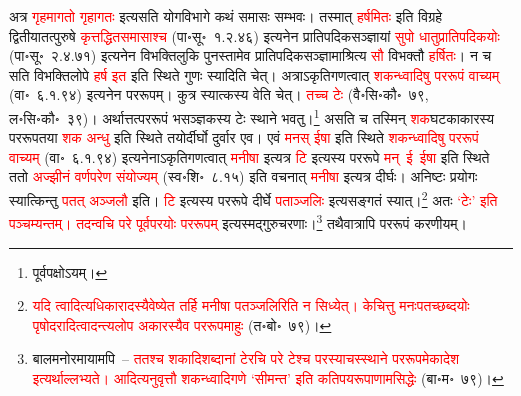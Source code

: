 \begin{sloppypar}\justifying\noindent अत्र \textcolor{red}{गृहमागतो गृहागतः} इत्यसति योग\-विभागे कथं समासः सम्भवः। तस्मात् \textcolor{red}{हर्षमितः} इति विग्रहे द्वितीया\-तत्पुरुषे \textcolor{red}{कृत्तद्धित\-समासाश्च} (पा॰सू॰~१.२.४६) इत्यनेन प्रातिपदिक\-सञ्ज्ञायां \textcolor{red}{सुपो धातु\-प्रातिपदिकयोः} (पा॰सू॰~२.४.७१) इत्यनेन विभक्ति\-लुकि पुनस्तामेव प्रातिपदिक\-सञ्ज्ञामाश्रित्य \textcolor{red}{सौ} विभक्तौ \textcolor{red}{हर्षितः}। न च सति विभक्ति\-लोपे \textcolor{red}{हर्ष इत} इति स्थिते गुणः स्यादिति चेत्। अत्राऽकृति\-गणत्वात् \textcolor{red}{शकन्ध्वादिषु पर\-रूपं वाच्यम्} (वा॰~६.१.९४) इत्यनेन पर\-रूपम्। कुत्र स्यात्कस्य वेति चेत्। \textcolor{red}{तच्च टेः} (वै॰सि॰कौ॰~७९, ल॰सि॰कौ॰~३९)। अर्थात्तत्पर\-रूपं भसञ्ज्ञकस्य टेः स्थाने भवतु।\footnote{पूर्वपक्षोऽयम्।} असति च तस्मिन् \textcolor{red}{शक}\-घटकाकारस्य पर\-रूपतया \textcolor{red}{शक अन्धु} इति स्थिते तयोर्दीर्घो दुर्वार एव। एवं \textcolor{red}{मनस् ईषा} इति स्थिते \textcolor{red}{शकन्ध्वादिषु पररूपं वाच्यम्} (वा॰~६.१.९४) इत्यनेनाऽकृति\-गणत्वात् \textcolor{red}{मनीषा} इत्यत्र \textcolor{red}{टि} इत्यस्य पररूपे \textcolor{red}{मन्~ई~ईषा} इति स्थिते ततो \textcolor{red}{अज्झीनं वर्णपरेण संयोज्यम्} (स्व॰शि॰~८.१५) इति वचनात् \textcolor{red}{मनीषा} इत्यत्र दीर्घः। अनिष्टः प्रयोगः स्यात्किन्तु \textcolor{red}{पतत् अञ्जलौ} इति। \textcolor{red}{टि} इत्यस्य पररूपे दीर्घे \textcolor{red}{पताञ्जलिः} इत्यसङ्गतं स्यात्।\footnote{\textcolor{red}{यदि त्वादित्यधि\-कारादस्यैवेष्येत तर्हि मनीषा पतञ्जलिरिति न सिध्येत्। केचित्तु मनः\-पतच्छब्दयोः पृषोदरादित्वादन्त्य\-लोप अकारस्यैव पररूपमाहुः} (त॰बो॰~७९)।} अतः \textcolor{red}{‘टेः’ इति पञ्चम्यन्तम्। तदन्वचि परे पूर्व\-परयोः पर\-रूपम्} इत्यस्मद्गुरु\-चरणाः।\footnote{बालमनोरमायामपि~– \textcolor{red}{ततश्च शकादि\-शब्दानां टेरचि परे टेश्च परस्याचस्स्थाने पर\-रूपमेकादेश इत्यर्थाल्लभ्यते। आदित्यनु\-वृत्तौ शकन्ध्वादिगणे ‘सीमन्त’ इति कतिपय\-रूपाणामसिद्धेः} (बा॰म॰~७९)।} तथैवात्रापि पर\-रूपं करणीयम्।\end{sloppypar}
